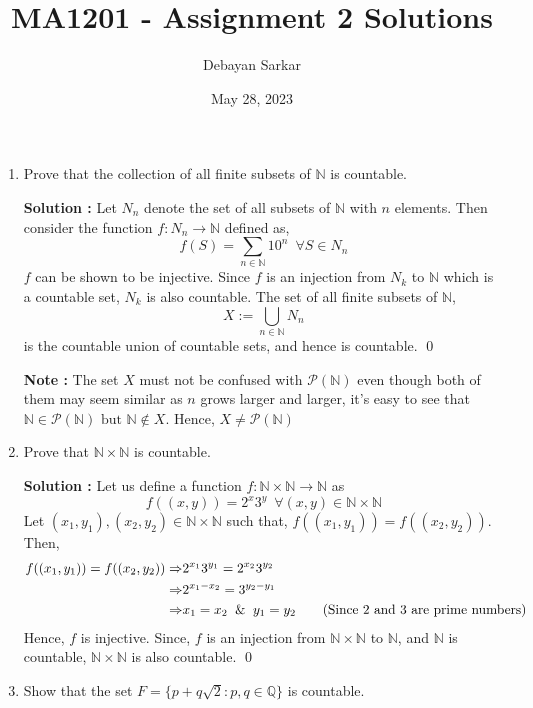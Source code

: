 \documentclass[10pt]{article}
\title{MA1201 - Assignment 2 Solutions}
\author{Debayan Sarkar}
\date{May 28, 2023}
\newcommand{\nn}{\mathbb{N}}
\newcommand{\q}{\mathbb{Q}}
\newcommand{\p}{\mathcal{P}}
\begin{document}
\maketitle
\begin{enumerate}
    \item Prove that the collection of all finite subsets of $\nn$ is countable.

	    \textbf{Solution : }Let $N_n$ denote the set of all subsets of $\nn$ with $n$ elements.
	    Then consider the function $f : N_n \to \nn$ defined as, 
	    $$f(S) = \sum_{n\in\nn} 10^{n} \,\,\, \forall S \in N_n$$
	    $f$ can be shown to be injective. Since $f$ is an injection from $N_k$ to $\nn$ which is a countable set, 
	    $N_k$ is also countable. The set of all finite subsets of $\nn$,
	    $$X := \bigcup_{n \in \nn} N_n$$ is the countable union of countable sets, and hence is countable. \qed

	    \textbf{Note : }The set $X$ must not be confused with $\p(\nn)$ even though both of them may seem similar as $n$ grows larger and larger, 
	    it's easy to see that $\nn \in \p(\nn) \text{ but } \nn \notin X$. Hence, $X \neq \p(\nn)$
    \item Prove that $\nn \times \nn$ is countable.

    \textbf{Solution : }Let us define a function $f : \nn \times \nn \to \nn$ as $$f((x, y)) = 2^x 3^y \,\,\, \forall (x, y) \in \nn \times \nn$$ Let $(x_1, y_1) , (x_2, y_2) \in \nn \times \nn$ such that, $f((x_1, y_1)) = f((x_2, y_2))$. Then, 
    \begin{align*}
        f((x_1, y_1)) = f((x_2, y_2))
        \Rightarrow &2^{x_1}3^{y_1} = 2^{x_2}3^{y_2} \\
        \Rightarrow &2^{x_1 - x_2} = 3^{y_2 - y_1}\\
        \Rightarrow &x_1 = x_2 \And y_1 = y_2 \tag{Since 2 and 3 are prime numbers}
    \end{align*}
    Hence, $f$ is injective. Since, $f$ is an injection from $\nn \times \nn$ to $\nn$, and $\nn$ is countable, $\nn \times \nn$ is also countable. \qed
    \item Show that the set $F = \{ p + q\sqrt{2}: p,q \in \q \}$ is countable.
    

\end{enumerate}
\end{document}
